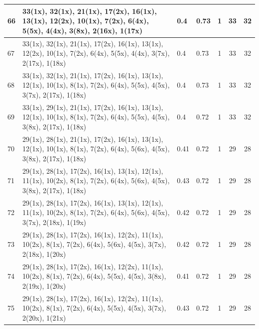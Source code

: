 \begin{small}
\begin{longtable}{|p{0.5cm}|p{9cm}|p{1.3cm}|p{1.3cm}|c|c|c|}
  66 & 33(1x), 32(1x), 21(1x), 17(2x), 16(1x), 13(1x), 12(2x), 10(1x), 7(2x), 6(4x), 5(5x), 4(4x), 3(8x), 2(16x), 1(17x) & \cellcolor{colorGood}  0.4 & \cellcolor{colorGood} 0.73 & 1 & 33 & \cellcolor{colorBad} 32 \\   \hline
  67 & 33(1x), 32(1x), 21(1x), 17(2x), 16(1x), 13(1x), 12(2x), 10(1x), 7(2x), 6(4x), 5(5x), 4(4x), 3(7x), 2(17x), 1(18x) & \cellcolor{colorGood}  0.4 & \cellcolor{colorGood} 0.73 & 1 & 33 & \cellcolor{colorBad} 32 \\   \hline
  68 & 33(1x), 32(1x), 21(1x), 17(2x), 16(1x), 13(1x), 12(1x), 10(1x), 8(1x), 7(2x), 6(4x), 5(5x), 4(5x), 3(7x), 2(17x), 1(18x) & \cellcolor{colorGood}  0.4 & \cellcolor{colorGood} 0.73 & 1 & 33 & \cellcolor{colorBad} 32 \\   \hline
  69 & 33(1x), 29(1x), 21(1x), 17(2x), 16(1x), 13(1x), 12(1x), 10(1x), 8(1x), 7(2x), 6(4x), 5(5x), 4(5x), 3(8x), 2(17x), 1(18x) & \cellcolor{colorGood}  0.4 & \cellcolor{colorGood} 0.72 & 1 & 33 & \cellcolor{colorBad} 32 \\   \hline
  70 & 29(1x), 28(1x), 21(1x), 17(2x), 16(1x), 13(1x), 12(1x), 10(1x), 8(1x), 7(2x), 6(4x), 5(6x), 4(5x), 3(8x), 2(17x), 1(18x) & \cellcolor{colorGood}  0.41 & \cellcolor{colorGood} 0.72 & 1 & 29 & \cellcolor{colorBad} 28 \\   \hline
  71 & 29(1x), 28(1x), 17(2x), 16(1x), 13(1x), 12(1x), 11(1x), 10(2x), 8(1x), 7(2x), 6(4x), 5(6x), 4(5x), 3(8x), 2(17x), 1(18x) & \cellcolor{colorGood}  0.43 & \cellcolor{colorGood} 0.72 & 1 & 29 & \cellcolor{colorBad} 28 \\   \hline
  72 & 29(1x), 28(1x), 17(2x), 16(1x), 13(1x), 12(1x), 11(1x), 10(2x), 8(1x), 7(2x), 6(4x), 5(6x), 4(5x), 3(7x), 2(18x), 1(19x) & \cellcolor{colorGood}  0.42 & \cellcolor{colorGood} 0.72 & 1 & 29 & \cellcolor{colorBad} 28 \\   \hline
  73 & 29(1x), 28(1x), 17(2x), 16(1x), 12(2x), 11(1x), 10(2x), 8(1x), 7(2x), 6(4x), 5(6x), 4(5x), 3(7x), 2(18x), 1(20x) & \cellcolor{colorGood}  0.42 & \cellcolor{colorGood} 0.72 & 1 & 29 & \cellcolor{colorBad} 28 \\   \hline
  74 & 29(1x), 28(1x), 17(2x), 16(1x), 12(2x), 11(1x), 10(2x), 8(1x), 7(2x), 6(4x), 5(5x), 4(5x), 3(8x), 2(19x), 1(20x) & \cellcolor{colorGood}  0.41 & \cellcolor{colorGood} 0.72 & 1 & 29 & \cellcolor{colorBad} 28 \\   \hline
  75 & 29(1x), 28(1x), 17(2x), 16(1x), 12(2x), 11(1x), 10(2x), 8(1x), 7(2x), 6(4x), 5(5x), 4(5x), 3(7x), 2(20x), 1(21x) & \cellcolor{colorGood}  0.43 & \cellcolor{colorGood} 0.72 & 1 & 29 & \cellcolor{colorBad} 28 \\   \hline

\end{longtable}
\end{small}
